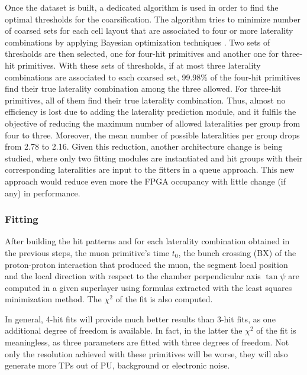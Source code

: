 \documentclass[../main.tex]{subfiles}
\begin{document}
Once the dataset is built, a dedicated algorithm is used in order to find the optimal thresholds for the coarsification. The algorithm tries to minimize number of coarsed sets for each cell layout that are associated to four or more laterality combinations by applying Bayesian optimization techniques \cite{dts:bayes, dts:bayes_python}. Two sets of thresholds are then selected, one for four-hit primitives and another one for three-hit primitives. With these sets of thresholds, if at most three laterality combinations are associated to each coarsed set, 99.98\% of the four-hit primitives find their true laterality combination among the three allowed. For three-hit primitives, all of them find their true laterality combination. Thus, almost no efficiency is lost due to adding the laterality prediction module, and it fulfils the objective of reducing the maximum number of allowed lateralities per group from four to three. Moreover, the mean number of possible lateralities per group drops from 2.78 to 2.16. Given this reduction, another architecture change is being studied, where only two fitting modules are instantiated and hit groups with their corresponding lateralities are input to the fitters in a queue approach. This new approach would reduce even more the FPGA occupancy with little change (if any) in performance. 


\subsubsection*{Fitting}

After building the hit patterns and for each laterality combination obtained in the previous steps, the muon primitive's time $t_0$, the bunch crossing (BX) of the proton-proton interaction that produced the muon, the segment local position and the local direction with respect to the chamber perpendicular axis $\tan\psi$ are computed in a given superlayer using formulas extracted with the least squares minimization method. The $\chi^2$ of the fit is also computed.

In general, 4-hit fits will provide much better results than 3-hit fits, as one additional degree of freedom is available. In fact, in the latter the $\chi^2$ of the fit is meaningless, as three parameters are fitted with three degrees of freedom. Not only the resolution achieved with these primitives will be worse, they will also generate more TPs out of PU, background or electronic noise.

\end{document}
